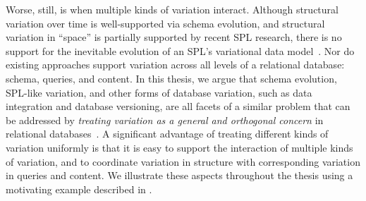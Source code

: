 


Worse, still, is when multiple kinds of variation interact. Although structural
variation over time is well-supported via schema evolution, and structural
variation in ``space'' is partially supported by recent SPL research, there is
no support for the inevitable evolution of an SPL's variational data
model~\cite{dbSPLevolve}. Nor do existing approaches support variation across
all levels of a relational database: schema, queries, and content.
%
In this thesis, we argue that schema evolution, SPL-like variation,
and other forms of database variation, such as data integration and database
versioning, are all facets of a similar problem that can be addressed by
\emph{treating variation as a general and orthogonal concern} in relational
databases~\cite{ATW17dbpl,ATW18poly,ALW21vamos, vldbArXiv}.
%
A significant advantage of treating different kinds of variation uniformly is
that it is easy to support the interaction of multiple kinds of variation, and
to coordinate variation in structure with corresponding variation in queries
and content. We illustrate these aspects throughout the thesis using a
motivating example described in .

